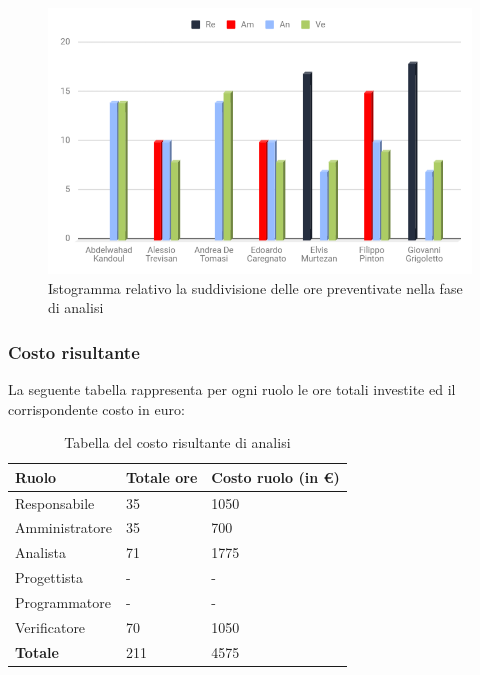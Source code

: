 \begin{figure}[h!]
	\centering
	\caption{Istogramma relativo la suddivisione delle ore preventivate nella fase di analisi}
	\includegraphics[scale=0.60]{./src/Preventivo/src/img/IstoAnalisi.png}
\end{figure}

\clearpage

\subsubsection{Costo risultante}
La seguente tabella rappresenta per ogni ruolo le ore totali investite ed il corrispondente costo in euro:
{
\renewcommand{\arraystretch}{2}
\begin{longtable}{ C{3cm} C{2cm} C{4cm}}
\caption{Tabella del costo risultante di analisi}\\
\rowcolor{\primaryColor}

\textcolor{\secondaryColor}{\textbf{Ruolo}} & 
\textcolor{\secondaryColor}{\textbf{Totale ore}} & 
\textcolor{\secondaryColor}{\textbf{Costo ruolo (in \euro{})}}\\	
\endhead

Responsabile    &  35 &  1050 \\
Amministratore  &  35 &  700 \\
Analista        &  71 & 1775 \\
Progettista     &   - &  - \\
Programmatore   &   - &  - \\
Verificatore    &  70 & 1050 \\
\textbf{Totale} & 211 & 4575 \\
		
\end{longtable}
}

